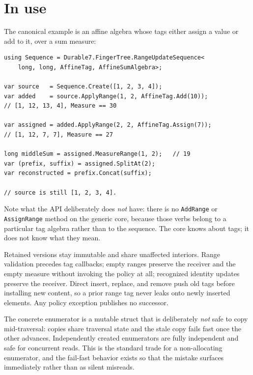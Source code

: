 \documentclass[11pt,twoside,openright]{book}
\newcommand{\code}[1]{\texorpdfstring{\textcolor{d7ink}{\texttt{#1}}}{#1}}
\begin{document}
\section{In use}

The canonical example is an affine algebra whose tags either assign a value or
add to it, over a sum measure:

\begin{lstlisting}[language={[Sharp]C}]
using Sequence = Durable7.FingerTree.RangeUpdateSequence<
    long, long, AffineTag, AffineSumAlgebra>;

var source   = Sequence.Create([1, 2, 3, 4]);
var added    = source.ApplyRange(1, 2, AffineTag.Add(10));
// [1, 12, 13, 4], Measure == 30

var assigned = added.ApplyRange(2, 2, AffineTag.Assign(7));
// [1, 12, 7, 7], Measure == 27

long middleSum = assigned.MeasureRange(1, 2);   // 19
var (prefix, suffix) = assigned.SplitAt(2);
var reconstructed = prefix.Concat(suffix);

// source is still [1, 2, 3, 4].
\end{lstlisting}

Note what the API deliberately does \emph{not} have: there is no \code{AddRange}
or \code{AssignRange} method on the generic core, because those verbs belong to
a particular tag algebra rather than to the sequence. The core knows about tags;
it does not know what they mean.

\begin{contractbox}
Retained versions stay immutable and share unaffected interiors. Range
validation precedes tag callbacks; empty ranges preserve the receiver and the
empty measure without invoking the policy at all; recognized identity updates
preserve the receiver. Direct insert, replace, and remove push old tags before
installing new content, so a prior range tag never leaks onto newly inserted
elements. Any policy exception publishes no successor.
\end{contractbox}

\begin{caveatbox}
The concrete enumerator is a mutable struct that is deliberately \emph{not}
safe to copy mid-traversal: copies share traversal state and the stale copy
fails fast once the other advances. Independently created enumerators are fully
independent and safe for concurrent reads. This is the standard trade for a
non-allocating enumerator, and the fail-fast behavior exists so that the
mistake surfaces immediately rather than as silent misreads.
\end{caveatbox}
\end{document}
